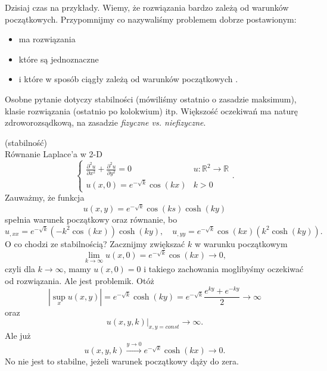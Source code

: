 \documentclass[../main.tex]{subfiles}
\begin{document}
		Dzisiaj czas na przykłady. Wiemy, że rozwiązania bardzo zależą od warunków początkowych. Przypomnijmy co nazywaliśmy problemem dobrze postawionym:
		\begin{itemize}
				\item ma rozwiązania
				\item które są jednoznaczne
				\item i które w sposób ciągły zależą od warunków początkowych
		.\end{itemize}
		Osobne pytanie dotyczy stabilności (mówiliśmy ostatnio o zasadzie maksimum), klasie rozwiązania (ostatnio po kolokwium) itp. Większość oczekiwań ma naturę zdroworozsądkową, na zasadzie \textit{fizyczne vs. niefizyczne}.
		\begin{przyklad}
				(stabilność)\\
				Równanie Laplace'a w 2-D
				\[
				\begin{cases}
						\frac{\partial ^2u}{\partial x^2} + \frac{\partial^2 u}{\partial y^2} = 0& u:\mathbb{R}^2\to \mathbb{R}\\
						u(x,0) = e^{-\sqrt{k} }\cos(kx)&k>0
				\end{cases}
				.\]
				Zauważmy, że funkcja
				\[
						u(x,y) = e^{-\sqrt{k} }\cos(ks) \cosh(ky)
				\]
				spełnia warunek początkowy oraz równanie, bo
				\[
						u_{,x x} = e^{-\sqrt{k} }\left( -k^2\cos(kx) \right) \cosh(ky),\quad u_{,y y} = e^{-\sqrt{k} }\cos(kx) \left( k^2 \cosh(ky) \right)
				.\]
				O co chodzi ze stabilnością? Zacznijmy zwiększać $k$ w warunku początkowym
				\[
						\lim_{k \to \infty}u(x,0) = e^{-\sqrt{k} }\cos(kx) \to 0
				,\]
				czyli dla $k\to \infty$, mamy $u(x,0) = 0$ i takiego zachowania moglibyśmy oczekiwać od rozwiązania. Ale jest problemik. Otóż
				\[
						\left| \underset{x}{\sup} u(x,y) \right| = e^{-\sqrt{k} }\cosh(ky) = e^{-\sqrt{k} }\frac{e^{ky}+e^{-ky}}{2} \to \infty
				\]
				oraz
				\[
						\left.u(x,y,k)\right|_{x,y=const} \to \infty
				.\]
				Ale już
				\[
						u(x,y,k) \overset{y\to 0}{\to } e^{-\sqrt{k} }\cosh(kx) \to 0
				.\]
				No nie jest to stabilne, jeżeli warunek początkowy dąży do zera.
		\end{przyklad}
\end{document}

